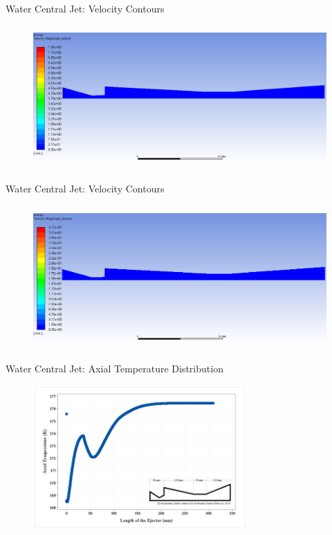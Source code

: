 \begin{frame}{Water Central Jet: Velocity Contours}
    \begin{figure}
        \centering
        \includegraphics[height=5.5cm]{images/wcjetwatervelcon.png}
    \end{figure}
\end{frame}

\begin{frame}{Water Central Jet: Velocity Contours}
    \begin{figure}
        \centering
        \includegraphics[height=5.5cm]{images/wcjetsteamvelcon.png}
    \end{figure}
\end{frame}

\begin{frame}{Water Central Jet: Axial Temperature Distribution}
    \begin{figure}
        \centering
        \includegraphics[height=5.5cm]{images/wcjetaxialtemp.png}
    \end{figure}
\end{frame}

